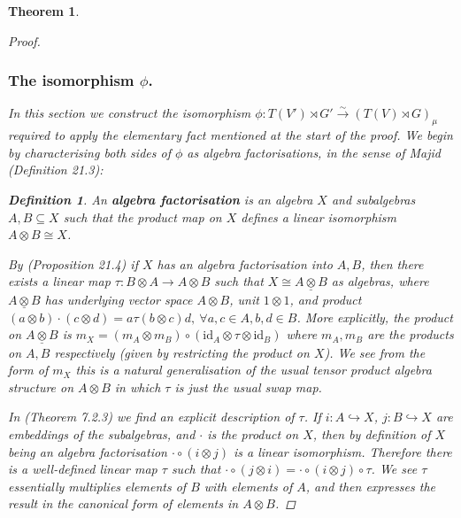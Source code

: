 \documentclass[10pt]{article}
\newcommand{\bb}{\medbreak}
\newcommand{\nt}{\noindent}
\newcommand{\rt}{\xrightarrow{}}
\newcommand{\xrt}{\xrightarrow}
\newcommand{\define}[1]{\textbf{#1}\index{#1}}
\newtheorem{theorem}[lemma]{Theorem}
\theoremstyle{definition}
\newtheorem{definition}[lemma]{Definition}
\begin{document}
\begin{theorem}
\begin{proof}
\subsubsection{The isomorphism \texorpdfstring{$\phi$}{phi}.} In this section we construct the isomorphism $\phi:T(V')\rtimes G'\xrt{\sim} (T(V)\rtimes G)_\mu$ required to apply the elementary fact mentioned at the start of the proof. We begin by characterising both sides of $\phi$ as algebra factorisations, in the sense of Majid \cite{alma9916633704401631} (Definition 21.3):
\begin{definition} An \define{algebra factorisation} is an algebra $X$ and subalgebras $A,B\subseteq X$ such that the product map on $X$ defines a linear isomorphism $A\otimes B\cong X$.
\end{definition}
\nt By \cite{alma9916633704401631} (Proposition 21.4) if $X$ has an algebra factorisation into $A,B$, then there exists a linear map $\tau:B\otimes A\rt A\otimes B$ such that $X\cong A\underline{\otimes}B$ as algebras, where $A\underline{\otimes}B$ has underlying vector space $A\otimes B$, unit $1\otimes 1$, and product $(a\otimes b)\cdot (c\otimes d)=a\tau(b\otimes c)d,\ \forall a,c\in A,b,d\in B$. More explicitly, the product on $A\underline{\otimes}B$ is $m_X=(m_A\otimes m_B)\circ (\text{id}_A\otimes \tau\otimes \text{id}_B)$ where $m_A,m_B$ are the products on $A,B$ respectively (given by restricting the product on $X$). We see from the form of $m_X$ this is a natural generalisation of the usual tensor product algebra structure on $A\otimes B$ in which $\tau$ is just the usual swap map.\bb

\nt In \cite{alma998944944401631} (Theorem 7.2.3) we find an explicit description of $\tau$. If $i:A\hookrightarrow X$, $j:B\hookrightarrow X$ are embeddings of the subalgebras, and $\cdot$ is the product on $X$, then by definition of $X$ being an algebra factorisation $\cdot \circ (i\otimes j)$ is a linear isomorphism. Therefore there is a well-defined linear map $\tau$ such that $\cdot \circ (j\otimes i)= \cdot \circ (i\otimes j)\circ \tau$. We see $\tau$ essentially multiplies elements of $B$ with elements of $A$, and then expresses the result in the canonical form of elements in $A\otimes B$.\bb


\end{proof}
\end{theorem}
\end{document}
